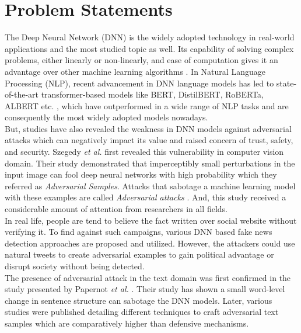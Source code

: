 \documentclass[%
	BCOR=8mm, %
	DIV=12,
	toc=bibliography, %
	toc=listof, %
	oneside, %
	egregdoesnotlikesansseriftitles, %
	]{scrbook}
\begin{document}
\section{Problem Statements}
The Deep Neural Network (DNN) is the widely  adopted technology in real-world applications and the most studied topic as well. Its capability of solving complex problems, either linearly or non-linearly, and ease of computation gives it an advantage over other machine learning algorithms \cite{huq_adversarial_2020}. In Natural Language Processing (NLP), recent advancement in DNN  language models  has led to state-of-the-art transformer-based models like BERT,  DistilBERT, RoBERTa, ALBERT etc. \cite{devlin_bert_2019-1,liu_roberta_2019-1,sanh_distilbert_2020,lan_albert_2020}, which have outperformed in a wide range of NLP tasks  and are consequently the most widely adopted models nowadays.\\
But, studies have also revealed the weakness in DNN models against adversarial attacks \cite{szegedy_intriguing_2014,yuan_adversarial_2018,akhtar_threat_2018,huq_adversarial_2020,zhang_adversarial_2019} which can negatively impact its value and raised concern of trust, safety, and security. Szegedy \textit{et al.} \cite{szegedy_intriguing_2014} first revealed this vulnerability in computer vision domain. Their study demonstrated that imperceptibly small perturbations in the input image can fool deep neural networks with high probability which they referred  as \textit{Adversarial Samples}. Attacks that sabotage a machine learning model with these examples are called \textit{Adversarial attacks} \cite{nicolae_adversarial_2019}. And, this study received a considerable amount of attention from researchers in all fields. \\
In real life, people are tend to believe the fact written over social website without verifying it. To find against such campaigns, various DNN based fake news detection approaches are proposed and utilized.  However, the attackers could use natural tweets to create adversarial examples to gain political advantage or disrupt society without being detected. \\
The presence of adversarial attack in the text domain was first confirmed in the study presented by Papernot \textit{et al.} \cite{papernot_crafting_2016}. Their  study has shown  a small word-level change in sentence structure can sabotage the DNN models. Later, various studies were published detailing different techniques to craft adversarial text samples which are comparatively higher than defensive mechanisms. \\
\end{document}
